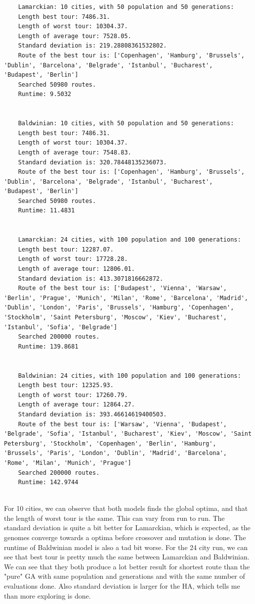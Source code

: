 \documentclass[a4paper, norsk, 12pt]{article}
\begin{document}
	\begin{lstlisting}
	Lamarckian: 10 cities, with 50 population and 50 generations:
 	Length best tour: 7486.31.
  	Length of worst tour: 10304.37.
  	Length of average tour: 7528.05.
  	Standard deviation is: 219.28808361532802.
  	Route of the best tour is: ['Copenhagen', 'Hamburg', 'Brussels', 'Dublin', 'Barcelona', 'Belgrade', 'Istanbul', 'Bucharest', 'Budapest', 'Berlin']
  	Searched 50980 routes.
  	Runtime: 9.5032


 	Baldwinian: 10 cities, with 50 population and 50 generations:
  	Length best tour: 7486.31.
  	Length of worst tour: 10304.37.
  	Length of average tour: 7548.83.
  	Standard deviation is: 320.78448135236073.
  	Route of the best tour is: ['Copenhagen', 'Hamburg', 'Brussels', 'Dublin', 'Barcelona', 'Belgrade', 'Istanbul', 'Bucharest', 'Budapest', 'Berlin']
  	Searched 50980 routes.
  	Runtime: 11.4831


 	Lamarckian: 24 cities, with 100 population and 100 generations:
 	Length best tour: 12287.07.
    Length of worst tour: 17728.28.
    Length of average tour: 12806.01.
  	Standard deviation is: 413.3071816662872.
  	Route of the best tour is: ['Budapest', 'Vienna', 'Warsaw', 'Berlin', 'Prague', 'Munich', 'Milan', 'Rome', 'Barcelona', 'Madrid', 'Dublin', 'London', 'Paris', 'Brussels', 'Hamburg', 'Copenhagen', 'Stockholm', 'Saint Petersburg', 'Moscow', 'Kiev', 'Bucharest', 'Istanbul', 'Sofia', 'Belgrade']
  	Searched 200000 routes.
  	Runtime: 139.8681


 	Baldwinian: 24 cities, with 100 population and 100 generations:
  	Length best tour: 12325.93.
  	Length of worst tour: 17260.79.
  	Length of average tour: 12864.27.
  	Standard deviation is: 393.46614619400503.
  	Route of the best tour is: ['Warsaw', 'Vienna', 'Budapest', 'Belgrade', 'Sofia', 'Istanbul', 'Bucharest', 'Kiev', 'Moscow', 'Saint Petersburg', 'Stockholm', 'Copenhagen', 'Berlin', 'Hamburg', 'Brussels', 'Paris', 'London', 'Dublin', 'Madrid', 'Barcelona', 'Rome', 'Milan', 'Munich', 'Prague']
  	Searched 200000 routes.
	Runtime: 142.9744
	
	\end{lstlisting}
For 10 cities, we can observe that both models finds the global optima, and that the length of worst tour is the same. This can vary from run to run. The standard deviation is quite a bit better for Lamarckian, which is expected, as the genomes converge towards a optima before crossover and mutation is done. The runtime of Baldwinian model is also a tad bit worse. For the 24 city run, we can see that best tour is pretty much the same between Lamarckian and Baldwinian. We can see that they both produce a lot better result for shortest route than the "pure" GA with same population and generations and with the same number of evaluations done. Also standard deviation is larger for the HA, which tells me than more exploring is done.
\end{document}
